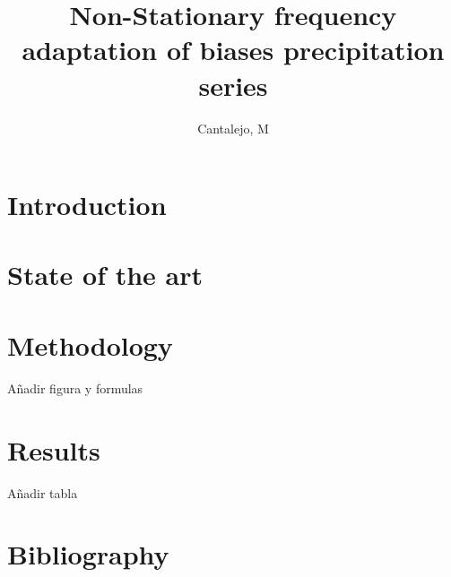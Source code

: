 \documentclass[a4paper,11pt]{article}
\begin{document}
\title{Non-Stationary frequency adaptation of biases precipitation series}
\author{Cantalejo, M}
\maketitle
{}



\section{Introduction}\label{sec1}



\section{State of the art}\label{sec2}



\section{Methodology}\label{sec1}
Añadir figura y formulas 

\section{Results}\label{sec1}
Añadir tabla 


\section{Bibliography}\label{sec1}
\end{document}
